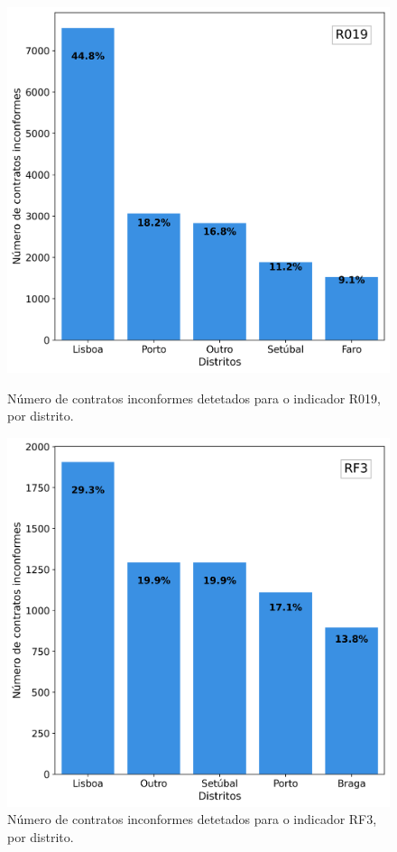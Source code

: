 \begin{figure}[H]
	\centering
	\begin{minipage}{.44\linewidth}
		\includegraphics[width=\linewidth]{imagens/final/bar_R019.png}
		\caption{Número de contratos inconformes detetados para o indicador R019, por distrito.}
		\label{final10}
		
	\end{minipage}
	\hfill
	\begin{minipage}{.44\linewidth}
		\includegraphics[width=\linewidth]{imagens/final/bar_RF3.png}
		\caption{Número de contratos inconformes detetados para o indicador RF3, por distrito.}
		\label{final11}
		
	\end{minipage}
\end{figure}


